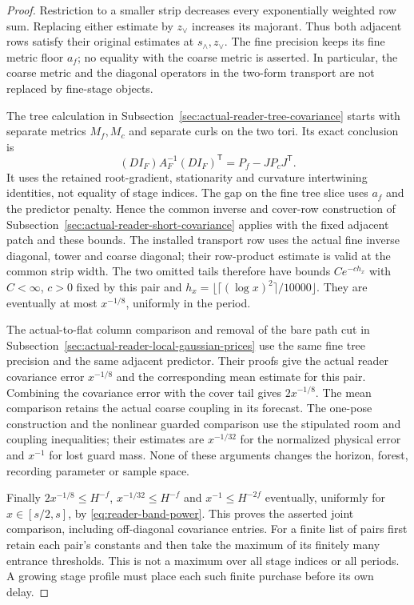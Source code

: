 \begin{proof}
Restriction to a smaller strip decreases every exponentially weighted
row sum. Replacing either estimate by $z_\vee$ increases its
majorant. Thus both adjacent rows satisfy their original estimates
at $s_\wedge,z_\vee$. The fine precision keeps its fine metric
floor $a_f$; no equality with the coarse metric is asserted. In
particular, the coarse metric and the diagonal operators in the
two-form transport are not replaced by fine-stage objects.

The tree calculation in
Subsection~\ref{sec:actual-reader-tree-covariance} starts with separate
metrics $M_f,M_c$ and separate curls on the two tori. Its exact
conclusion is
\[
 (DI_F)A_F^{-1}(DI_F)^{\mathsf T}=P_f-JP_cJ^{\mathsf T}.
\]
It uses the retained root-gradient, stationarity and curvature
intertwining identities, not equality of stage indices. The gap on
the fine tree slice uses $a_f$ and the predictor penalty. Hence the
common inverse and cover-row construction of
Subsection~\ref{sec:actual-reader-short-covariance} applies with the
fixed adjacent patch and these bounds. The installed transport row
uses the actual fine inverse diagonal, tower and coarse diagonal;
their row-product estimate is valid at the common strip width.
The two omitted tails therefore have bounds $C e^{-c h_x}$ with
$C<\infty$, $c>0$ fixed by this pair and
$h_x=\lfloor\lceil(\log x)^2\rceil/10000\rfloor$.
They are eventually at most $x^{-1/8}$, uniformly in the period.

The actual-to-flat column comparison and removal of the bare path
cut in Subsection~\ref{sec:actual-reader-local-gaussian-prices} use the
same fine tree precision and the same adjacent predictor. Their
proofs give the actual reader covariance error $x^{-1/8}$ and
the corresponding mean estimate for this pair. Combining the
covariance error with the cover tail gives $2x^{-1/8}$. The mean
comparison retains the actual coarse coupling in its forecast.
The one-pose construction and the nonlinear guarded comparison
use the stipulated room and coupling inequalities; their estimates
are $x^{-1/32}$ for the normalized physical error and $x^{-1}$
for lost guard mass. None of these arguments changes the horizon,
forest, recording parameter or sample space.

Finally $2x^{-1/8}\le H^{-f}$, $x^{-1/32}\le H^{-f}$ and
$x^{-1}\le H^{-2f}$ eventually, uniformly for $x\in[s/2,s]$,
by \eqref{eq:reader-band-power}. This proves the asserted joint
comparison, including off-diagonal covariance entries. For a finite
list of pairs first retain each pair's constants and then take the
maximum of its finitely many entrance thresholds. This is not a
maximum over all stage indices or all periods. A growing stage
profile must place each such finite purchase before its own delay.
\end{proof}

